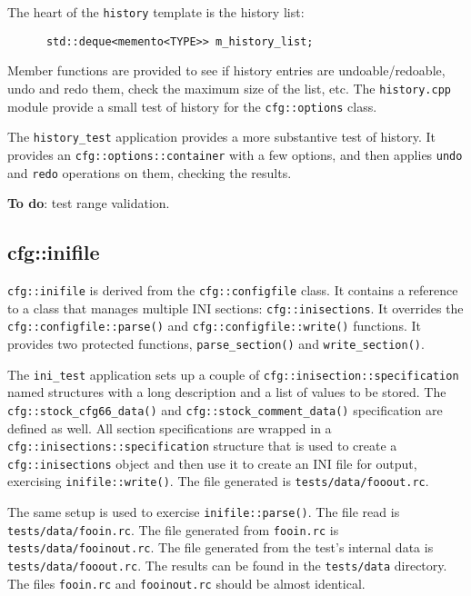    The heart of the \texttt{history} template is the history list:

   \begin{verbatim}
      std::deque<memento<TYPE>> m_history_list;
   \end{verbatim}

   Member functions are provided to see if history entries are
   undoable/redoable, undo and redo them, check the maximum size of the list,
   etc.
   The \texttt{history.cpp} module provide a small test of history for
   the \texttt{cfg::options} class.

   The \texttt{history\_test} application provides a more substantive
   test of history.
   It provides an \texttt{cfg::options::container} with a few options, and
   then applies \texttt{undo} and
   \texttt{redo} operations on them, checking the results.

   \textbf{To do}: test range validation.

\subsection{cfg::inifile}
\label{subsec:cfg_namespace_inifile}

   \texttt{cfg::inifile} is derived from the \texttt{cfg::configfile} class.
   It contains a reference to a class that manages multiple
   INI sections: \texttt{cfg::inisections}.
   It overrides the
   \texttt{cfg::configfile::parse()} and
   \texttt{cfg::configfile::write()} functions.
   It provides two protected functions,
   \texttt{parse\_section()} and
   \texttt{write\_section()}.

   The \texttt{ini\_test} application sets up a couple of
   \texttt{cfg::inisection::specification} named structures 
   with a long description and a list of values to be stored.
   The \texttt{cfg::stock\_cfg66\_data()} and
   \texttt{cfg::stock\_comment\_data()} specification are defined as well.
   All section specifications are wrapped in a
   \texttt{cfg::inisections::specification} structure
   that is used to create a
   \texttt{cfg::inisections} object and then use it to
   create an INI file for output, exercising \texttt{inifile::write()}.
   The file generated is \texttt{tests/data/fooout.rc}.

   The same setup is used to exercise \texttt{inifile::parse()}.
   The file read is \texttt{tests/data/fooin.rc}.
   The file generated from \texttt{fooin.rc} is
   \texttt{tests/data/fooinout.rc}.
   The file generated from the test's internal data is
   \texttt{tests/data/fooout.rc}.
   The results can be found in the \texttt{tests/data} directory.
   The files \texttt{fooin.rc} and 
   \texttt{fooinout.rc} should be almost identical.

